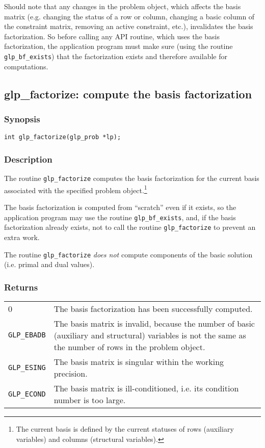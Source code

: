 Should note that any changes in the problem object, which affects the
basis matrix (e.g. changing the status of a row or column, changing
a basic column of the constraint matrix, removing an active constraint,
etc.), invalidates the basis factorization. So before calling any API
routine, which uses the basis factorization, the application program
must make sure (using the routine \verb|glp_bf_exists|) that the
factorization exists and therefore available for computations.


\subsection{glp\_factorize: compute the basis factorization}

\subsubsection*{Synopsis}

\begin{verbatim}
int glp_factorize(glp_prob *lp);
\end{verbatim}

\subsubsection*{Description}

The routine \verb|glp_factorize| computes the basis factorization for
the current basis associated with the specified problem
object.\footnote{The current basis is defined by the current statuses
of rows (auxiliary variables) and columns (structural variables).}

The basis factorization is computed from ``scratch'' even if it exists,
so the application program may use the routine \verb|glp_bf_exists|,
and, if the basis factorization already exists, not to call the routine
\verb|glp_factorize| to prevent an extra work.

The routine \verb|glp_factorize| {\it does not} compute components of
the basic solution (i.e. primal and dual values).

\subsubsection*{Returns}

\begin{tabular}{@{}p{25mm}p{97.3mm}@{}}
0 & The basis factorization has been successfully computed.\\
\verb|GLP_EBADB| & The basis matrix is invalid, because the number of
basic (auxiliary and structural) variables is not the same as the number
of rows in the problem object.\\
\verb|GLP_ESING| & The basis matrix is singular within the working
precision.\\
\verb|GLP_ECOND| & The basis matrix is ill-conditioned, i.e. its
condition number is too large.\\
\end{tabular}


